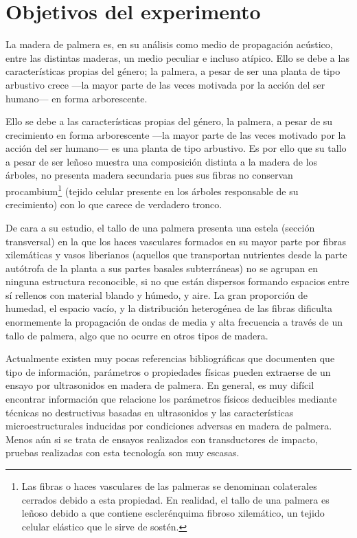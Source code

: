 \section{Objetivos del experimento}

La madera de palmera es, en su análisis como medio de propagación acústico,
entre las distintas maderas, un medio peculiar e incluso atípico. Ello se
debe a las características propias del género; la palmera, a pesar de ser
una planta de tipo arbustivo crece ---la mayor parte de las veces motivada
por la acción del ser humano--- en forma arborescente.

Ello se debe a las características propias del género, la palmera, a pesar
de su crecimiento en forma arborescente ---la mayor parte de las veces
motivado por la acción del ser humano--- es una planta de tipo arbustivo.
Es por ello que su tallo a pesar de ser leñoso muestra una composición
distinta a la madera de los árboles, no presenta madera secundaria pues sus
fibras no conservan procambium\footnote{Las fibras o haces vasculares de
las palmeras se denominan colaterales cerrados debido a esta propiedad. En
realidad, el tallo de una palmera es leñoso debido a que contiene
esclerénquima fibroso xilemático, un tejido celular elástico que le sirve
de sostén.} (tejido celular presente en los árboles responsable de su
crecimiento) con lo que carece de verdadero tronco.

De cara a su estudio, el tallo de una palmera presenta una estela (sección
transversal) en la que los haces vasculares formados en su mayor parte por
fibras xilemáticas y vasos liberianos (aquellos que transportan nutrientes
desde la parte autótrofa de la planta a sus partes basales subterráneas) no
se agrupan en ninguna estructura reconocible, si no que están dispersos
formando espacios entre sí rellenos con material blando y húmedo, y aire.
La gran proporción de humedad, el espacio vacío, y la distribución
heterogénea de las fibras dificulta enormemente la propagación de ondas de
media y alta frecuencia a través de un tallo de palmera, algo que no ocurre
en otros tipos de madera.

Actualmente existen muy pocas referencias bibliográficas que documenten que
tipo de información, parámetros o propiedades físicas pueden extraerse de
un ensayo por ultrasonidos en madera de palmera. En general, es muy difícil
encontrar información que relacione los parámetros físicos deducibles
mediante técnicas no destructivas basadas en ultrasonidos y las
características microestructurales inducidas por condiciones adversas en
madera de palmera. Menos aún si se trata de ensayos realizados con
transductores de impacto, pruebas realizadas con esta tecnología son muy
escasas.

